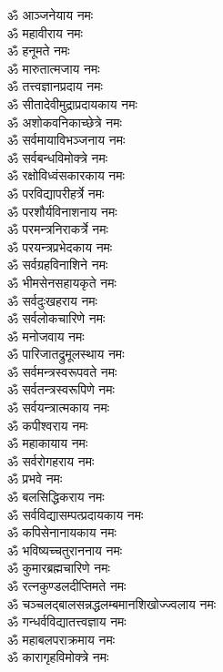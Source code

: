 \begin{multicols}{2}
\begin{flushleft}
ॐ आञ्जनेयाय नमः\\
ॐ महावीराय नमः\\
ॐ हनूमते नमः\\
ॐ मारुतात्मजाय नमः\\
ॐ तत्त्वज्ञानप्रदाय नमः\\
ॐ सीतादेवीमुद्राप्रदायकाय नमः\\
ॐ अशोकवनिकाच्छेत्रे नमः\\
ॐ सर्वमायाविभञ्जनाय नमः\\
ॐ सर्वबन्धविमोक्त्रे नमः\\
ॐ रक्षोविध्वंसकारकाय नमः\hfill{}\\
ॐ परविद्यापरीहर्त्रे नमः\\
ॐ परशौर्यविनाशनाय नमः\\
ॐ परमन्त्रनिराकर्त्रे नमः\\
ॐ परयन्त्रप्रभेदकाय नमः\\
ॐ सर्वग्रहविनाशिने नमः\\
ॐ भीमसेनसहायकृते नमः\\
ॐ सर्वदुःखहराय नमः\\
ॐ सर्वलोकचारिणे नमः\\
ॐ मनोजवाय नमः\\
ॐ पारिजातद्रुमूलस्थाय नमः\hfill{}\\
ॐ सर्वमन्त्रस्वरूपवते नमः\\
ॐ सर्वतन्त्रस्वरूपिणे नमः\\
ॐ सर्वयन्त्रात्मकाय नमः\\
ॐ कपीश्वराय नमः\\
ॐ महाकायाय नमः\\
ॐ सर्वरोगहराय नमः\\
ॐ प्रभवे नमः\\
ॐ बलसिद्धिकराय नमः\\
ॐ सर्वविद्यासम्पत्प्रदायकाय नमः\\
ॐ कपिसेनानायकाय नमः\hfill{}\\
ॐ भविष्यच्चतुराननाय नमः\\
ॐ कुमारब्रह्मचारिणे नमः\\
ॐ रत्नकुण्डलदीप्तिमते नमः\\
ॐ चञ्चलद्बालसन्नद्ध\-लम्बमानशिखोज्ज्वलाय नमः\\
ॐ गन्धर्वविद्यातत्त्वज्ञाय नमः\\
ॐ महाबलपराक्रमाय नमः\\
ॐ कारागृहविमोक्त्रे नमः\\

\end{flushleft}
\end{multicols}
